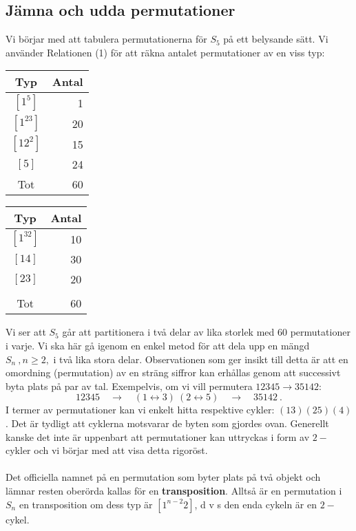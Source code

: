 \documentclass{article}
\begin{document}
\subsection{Jämna och udda permutationer}
Vi börjar med att tabulera permutationerna för $S_5$ på ett belysande sätt. Vi använder Relationen (1) för att räkna antalet permutationer av en viss typ:
\begin{center}
\begin{tabular}{c | r}
Typ & Antal
\\ \hline
$[1^5]$ & 1
\\
$[1^23]$ & 20
\\
$[12^2]$ & 15
\\
$[5]$ & 24
\\ \hline
Tot & 60
\end{tabular}
\hspace{1 cm}
\begin{tabular}{c | r}
Typ & Antal
\\
\hline
$[1^32]$ & 10
\\
$[14]$ & 30
\\
$[23]$ & 20
\\
 &
\\ \hline
Tot & 60
\end{tabular}
\end{center}
Vi ser att $S_5$ går att partitionera i två delar av lika storlek med $60$ permutationer i varje. Vi ska här gå igenom en enkel metod för att dela upp en mängd $S_n \ ,n\geq 2,$ i två lika stora delar. Observationen som ger insikt till detta är att en omordning (permutation) av en sträng siffror kan erhållas genom att successivt byta plats på par av tal. Exempelvis, om vi vill permutera $12345\rightarrow35142$:
$$
12345 \quad \rightarrow \quad (1\leftrightarrow3) \ (2\leftrightarrow5) \quad \rightarrow \quad 35142 \ .
$$
I termer av permutationer kan vi enkelt hitta respektive cykler: $(13)(25)(4)$. Det är tydligt att cyklerna motsvarar de byten som gjordes ovan. Generellt kanske det inte är uppenbart att permutationer kan uttryckas i form av $2-$cykler och vi börjar med att visa detta rigoröst.
\\ \\
Det officiella namnet på en permutation som byter plats på två objekt och lämnar resten oberörda kallas för en \textbf{transposition}. Alltså är en permutation i $S_n$ en transposition om dess typ är $[1^{n-2}2]$, d v s den enda cykeln är en $2-$cykel.
\end{document}
